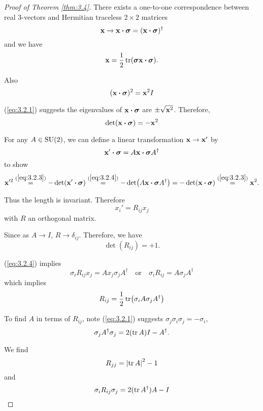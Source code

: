 \documentclass[a4paper,11pt]{article}
\begin{document}
	\begin{proof}[Proof of Theorem \ref{thm:3.4}] 
		There exists a one-to-one correspondence between real 3-vectors and Hermitian traceless $2 \times 2$ matrices
		\[
			\vb x \to \vb x \vdot \bm \sigma = (\vb x \vdot \bm \sigma)^\dagger 
		\]
		and we have
		\[
			\vb x = \frac{1}{2} \tr (\bm \sigma \vb x \vdot \bm \sigma).
		\]
		
		Also
		\begin{equation}
			(\vb x \vdot \bm \sigma)^2 = \vb x^2 I
			\label{eq:3.2.2}
		\end{equation}

		(\ref{eq:3.2.1}) suggests the eigenvalues of $\vb x \vdot \bm \sigma$ are $\pm \sqrt{\vb x^2}$. Therefore,
		\begin{equation}
			\det (\vb x \vdot \bm \sigma) = - \vb x^2
			\label{eq:3.2.3}
		\end{equation}

		For any $A \in \operatorname{SU}(2)$, we can define a linear transformation $\vb x \to \vb x'$ by
		\begin{equation}
			\vb x' \vdot \bm \sigma = A \vb x \vdot \bm \sigma A^\dagger
			\label{eq:3.2.4}
		\end{equation}
		to show
		\begin{equation*}
			\vb x'^2 \overset{(\ref{eq:3.2.3})}{=} - \det (\vb x' \vdot \bm \sigma) \overset{(\ref{eq:3.2.4})}{=} - \det (A \vb x \vdot \bm \sigma A^\dagger) = - \det (\vb x \vdot \bm \sigma) \overset{(\ref{eq:3.2.3})}{=} \vb x^2.
		\end{equation*}

		Thus the length is invariant. Therefore
		\[
			x_i' = R _{ij}x_j
		\]
		with $R$ an orthogonal matrix.

		Since as $A \to I$, $R \to \delta _{ij}$. Therefore, we have
		\[
			\det (R _{ij}) = +1.
		\]

		(\ref{eq:3.2.4}) implies
		\[
			\sigma_i R _{ij} x_j = A x _{j} \sigma _{j} A^\dagger \quad \text{or} \quad \sigma_i R _{ij} = A \sigma_j A^\dagger
		\]
		which implies
		\[
			R _{ij} = \frac{1}{2} \tr (\sigma_i A \sigma_j A^\dagger)
		\]
		
		To find $A$ in terms of $R _{ij}$, note (\ref{eq:3.2.1}) suggests $\sigma_j \sigma_i \sigma_j = - \sigma_i$, 
		\[
			\sigma_j A^\dagger \sigma_j = 2 (\tr A)I - A^\dagger.
		\]

		We find
		\begin{equation}
			R_{jj} = \abs{\tr A}^2 - 1
			\label{eq:3.2.5}
		\end{equation}
		and
		\begin{equation}
			\sigma_i R _{ij} \sigma_j = 2 (\tr A^\dagger) A - I
			\label{eq:3.2.6}
		\end{equation}


\end{proof}
\end{document}
